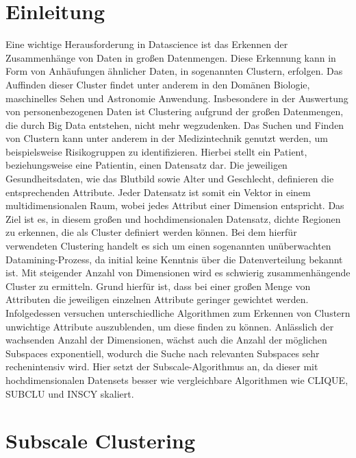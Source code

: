 \documentclass[utf8,biblatex]{lni}
\begin{document}

\section{Einleitung}
Eine wichtige Herausforderung in Datascience ist das Erkennen der Zusammenhänge von Daten in
großen Datenmengen.
Diese Erkennung kann in Form von Anhäufungen ähnlicher Daten, in sogenannten Clustern, erfolgen.
Das Auffinden dieser Cluster findet unter anderem in den Domänen Biologie, maschinelles Sehen und
Astronomie Anwendung.
Insbesondere in der Auswertung von personenbezogenen Daten ist Clustering aufgrund der großen
Datenmengen, die durch Big Data entstehen, nicht mehr wegzudenken. 
Das Suchen und Finden von Clustern kann unter anderem in der Medizintechnik genutzt werden, um
beispielsweise Risikogruppen zu identifizieren. 
Hierbei stellt ein Patient, beziehungsweise eine Patientin, einen Datensatz dar.
Die jeweiligen Gesundheitsdaten, wie das Blutbild sowie Alter und Geschlecht, definieren die
entsprechenden Attribute. 
Jeder Datensatz ist somit ein Vektor in einem multidimensionalen Raum,
wobei jedes Attribut einer Dimension entspricht.
Das Ziel ist es, in diesem großen und hochdimensionalen Datensatz, dichte Regionen zu erkennen,
die als Cluster definiert werden können.
Bei dem hierfür verwendeten Clustering handelt es sich um einen sogenannten
unüberwachten Datamining-Prozess, da initial keine Kenntnis über die
Datenverteilung bekannt ist.
Mit steigender Anzahl von Dimensionen wird es schwierig
zusammenhängende Cluster zu ermitteln.
Grund hierfür ist, dass bei einer großen Menge von Attributen die jeweiligen einzelnen
Attribute geringer gewichtet werden.
Infolgedessen versuchen unterschiedliche Algorithmen zum Erkennen von Clustern unwichtige 
Attribute auszublenden, um diese finden zu können. 
Anlässlich der wachsenden Anzahl der Dimensionen, wächst auch die Anzahl der möglichen
Subspaces exponentiell, wodurch die Suche nach relevanten Subspaces sehr rechenintensiv wird.  
Hier setzt der Subscale-Algorithmus an, da dieser mit hochdimensionalen Datensets besser wie
vergleichbare Algorithmen wie CLIQUE, SUBCLU und INSCY skaliert.


\section{Subscale Clustering}
\end{document}
